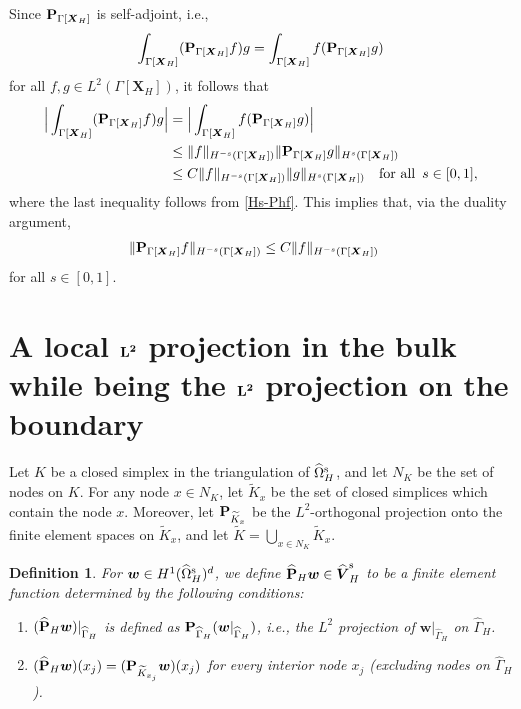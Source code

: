 \documentclass[11pt,reqno]{amsart}
\theoremstyle{definition}
\theoremstyle{plain}
\newtheorem{definition}{Definition}[section]
\numberwithin{theorem}{section}
\numberwithin{proposition}{section}
\numberwithin{lemma}{section}
\numberwithin{equation}{section}
\newcommand{\bs}[1]{\boldsymbol{#1}}
\renewcommand{\(}{\bigl(}
\renewcommand{\)}{\bigr)}
\begin{document}
Since ${\bf P}_{\Gamma[\bs X_H]}$ is self-adjoint, i.e., 
$$
\int_{\Gamma[\bs X_H]} ({\bf P}_{\Gamma[\bs X_H]} f)g = 
\int_{\Gamma[\bs X_H]} f ({\bf P}_{\Gamma[\bs X_H]} g) 
$$
for all $f,g\in L^2(\Gamma[\bs X_H])$, 
it follows that 
\begin{align*} 
\Big|\int_{\Gamma[\bs X_H]} ({\bf P}_{\Gamma[\bs X_H]} f)g\Big|
&=\Big|\int_{\Gamma[\bs X_H]} f({\bf P}_{\Gamma[\bs X_H]} g)\Big| \notag\\
&\le \|f\|_{H^{-s}(\Gamma[\bs X_H])} \|{\bf P}_{\Gamma[\bs X_H]} g\|_{H^{s}(\Gamma[\bs X_H])} \notag\\
&\le C\|f\|_{H^{-s}(\Gamma[\bs X_H])} \|g\|_{H^{s}(\Gamma[\bs X_H])} \quad\mbox{for all}\,\,\, s\in[0,1] , 
\end{align*}
where the last inequality follows from \eqref{Hs-Phf}. 
This implies that, via the duality argument, 
\begin{align}\label{H-s-Phf}
\|{\bf P}_{\Gamma[\bs X_H]} f\|_{H^{-s}(\Gamma[\bs X_H])}
&\le C\|f\|_{H^{-s}(\Gamma[\bs X_H])} 
\end{align}
for all $s\in[0,1]$. 

\section{A local ${\bf L^2}$ projection in the bulk while being the ${\bf L^2}$ projection on the boundary} \label{appendix:projection}

Let $K$ be a closed simplex in the triangulation of $\widehat\Omega^{\rm s}_H$, and let $N_K$ be the set of nodes on $K$. For any node $x\in N_K$, let $\widetilde K_x$ be the set of closed simplices which contain the node $x$. Moreover, let ${\bf P}_{\widetilde K_x}$ be the $L^2$-orthogonal projection onto the finite element spaces on $\widetilde K_x$, and let $\widetilde K=\bigcup_{x\in N_K}\widetilde K_x$. 

\begin{definition}\label{L2-L2-proj}
For ${\bs w}\in H^1(\widehat\Omega^{\rm s}_H)^d$, we define $\widehat{\bf P}_H{\bs w}\in \widehat{\bs V}^{\rm s}_H$ to be a finite element function determined by the following conditions: 
\begin{enumerate}
\item 
$(\widehat{\bf P}_H{\bs w})|_{\widehat\Gamma_H}$ is defined as ${\bf P}_{\widehat\Gamma_H}({\bs w}|_{\widehat\Gamma_H})$, i.e., the $L^2$ projection of ${\bs w}|_{\widehat\Gamma_H}$ on $\widehat\Gamma_H$. 

\item 
$(\widehat{\bf P}_H{\bs w})(x_j)=({\bf P}_{\widetilde K_{x_j}}{\bs w})(x_j)$ for every interior node $x_j$ {\rm(}excluding nodes on $\widehat\Gamma_H${\rm)}.
\end{enumerate}
\end{definition}
\end{document}
